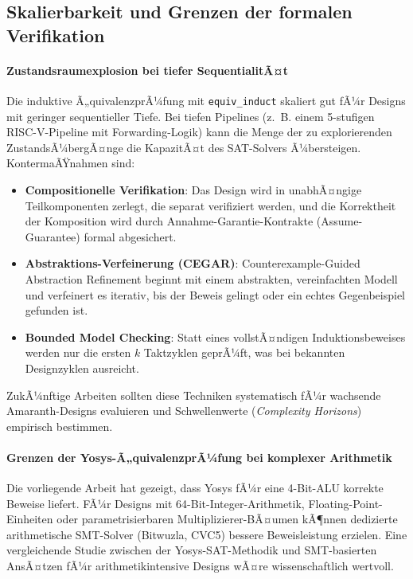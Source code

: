﻿\documentclass[12pt,a4paper]{report}
\begin{document}
\subsection{Skalierbarkeit und Grenzen der formalen Verifikation}

\paragraph{Zustandsraumexplosion bei tiefer SequentialitÃ¤t}
Die induktive Ã„quivalenzprÃ¼fung mit \texttt{equiv\_induct} skaliert gut fÃ¼r
Designs mit geringer sequentieller Tiefe. Bei tiefen Pipelines (z.~B. einem
5-stufigen RISC-V-Pipeline mit Forwarding-Logik) kann die Menge der zu explorierenden
ZustandsÃ¼bergÃ¤nge die KapazitÃ¤t des SAT-Solvers Ã¼bersteigen. 
KontermaÃŸnahmen sind:
\begin{itemize}
    \item \textbf{Compositionelle Verifikation}: Das Design wird in unabhÃ¤ngige
          Teilkomponenten zerlegt, die separat verifiziert werden, und die Korrektheit
          der Komposition wird durch Annahme-Garantie-Kontrakte (Assume-Guarantee)
          formal abgesichert.
    \item \textbf{Abstraktions-Verfeinerung (CEGAR)}: Counterexample-Guided Abstraction
          Refinement beginnt mit einem abstrakten, vereinfachten Modell und verfeinert
          es iterativ, bis der Beweis gelingt oder ein echtes Gegenbeispiel gefunden ist.
    \item \textbf{Bounded Model Checking}: Statt eines vollstÃ¤ndigen Induktionsbeweises
          werden nur die ersten $k$ Taktzyklen geprÃ¼ft, was bei bekannten Designzyklen
          ausreicht.
\end{itemize}
ZukÃ¼nftige Arbeiten sollten diese Techniken systematisch fÃ¼r wachsende Amaranth-Designs
evaluieren und Schwellenwerte (\textit{Complexity Horizons}) empirisch bestimmen.

\paragraph{Grenzen der Yosys-Ã„quivalenzprÃ¼fung bei komplexer Arithmetik}
Die vorliegende Arbeit hat gezeigt, dass Yosys fÃ¼r eine 4-Bit-ALU korrekte Beweise
liefert. FÃ¼r Designs mit 64-Bit-Integer-Arithmetik, Floating-Point-Einheiten oder
parametrisierbaren Multiplizierer-BÃ¤umen kÃ¶nnen dedizierte arithmetische SMT-Solver
(Bitwuzla, CVC5) bessere Beweisleistung erzielen. Eine vergleichende Studie zwischen
der Yosys-SAT-Methodik und SMT-basierten AnsÃ¤tzen fÃ¼r arithmetikintensive Designs wÃ¤re
wissenschaftlich wertvoll.
\end{document}
